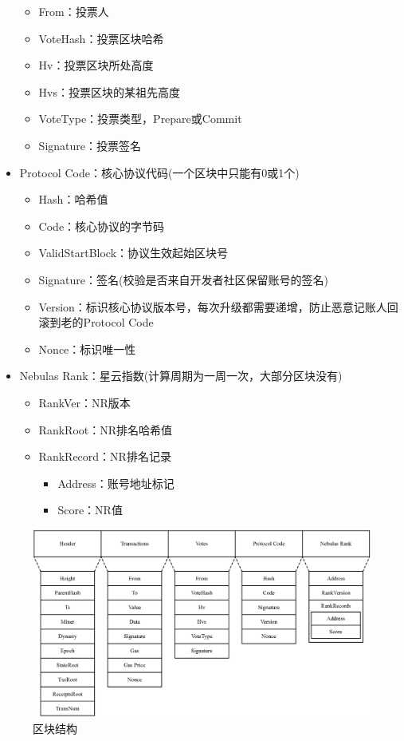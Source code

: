 \begin{itemize}
\begin{itemize}
		\item From：投票人
		\item VoteHash：投票区块哈希
		\item Hv：投票区块所处高度
		\item Hvs：投票区块的某祖先高度
		\item VoteType：投票类型，Prepare或Commit
		\item Signature：投票签名
		\end{itemize}
	\item Protocol Code：核心协议代码(一个区块中只能有0或1个)
		\begin{itemize}
		\item Hash：哈希值
		\item Code：核心协议的字节码
		\item ValidStartBlock：协议生效起始区块号
		\item Signature：签名(校验是否来自开发者社区保留账号的签名)
		\item Version：标识核心协议版本号，每次升级都需要递增，防止恶意记账人回滚到老的Protocol Code
		\item Nonce：标识唯一性
		\end{itemize}
	\item Nebulas Rank：星云指数(计算周期为一周一次，大部分区块没有)
		\begin{itemize}
		\item RankVer：NR版本
		\item RankRoot：NR排名哈希值
		\item RankRecord：NR排名记录
			\begin{itemize}
				\item Address：账号地址标记
				\item Score：NR值
			\end{itemize}
		\end{itemize}
\end{itemize}

\begin{figure}[h]
\centering
\includegraphics[width=13.8cm]{./figs/block}
\caption{区块结构}
\label{fig:block}
\end{figure}


